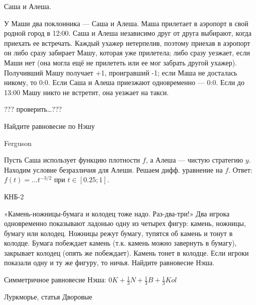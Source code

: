 \begin{problem}
Саша и Алеша.

У Маши два поклонника — Саша и Алеша. Маша прилетает в аэропорт в свой родной город в 12:00. Саша и Алеша независимо друг от друга выбирают, когда приехать ее встречать. Каждый ухажер нетерпелив, поэтому приехав в аэропорт он либо сразу забирает Машу, которая уже прилетела; либо сразу уезжает, если Маши нет (она могла ещё не прилететь или ее мог забрать другой ухажер). Получивший Машу получает +1, проигравший -1; если Маша не досталась никому, то 0:0. Если Саша и Алеша приезжают одновременно — 0:0. Если до 13:00 Машу никто не встретит, она уезжает на такси.

??? проверить\ldots ???


Найдите равновесие по Нэшу



\begin{source}
Ferguson
\end{source}


\begin{sol}
Пусть Саша использует функцию плотности $f$, а Алеша — чистую стратегию $y$. Находим условие безразличия для Алеши. Решаем дифф. уравнение на $f$. Ответ: $f(t)=\ldots t^{-3/2}$ при $t\in[0.25;1]$.
\end{sol}
\end{problem}



\begin{problem}
КНБ-2

«Камень-ножницы-бумага и колодец тоже надо. Раз-два-три!»
Два игрока одновременно показывают ладонью одну из четырех фигур: камень, ножницы, бумагу или колодец. Ножницы режут бумагу, тупятся об камень и тонут в колодце. Бумага побеждает камень (т.к. камень можно завернуть в бумагу), закрывает колодец (опять же побеждает). Камень тонет в колодце. Если игроки показали одну и ту же фигуру, то ничья. Найдите равновесие Нэша.



\begin{sol}
Симметричное равновесие Нэша: $0K+\frac{1}{3}N+\frac{1}{3}B+\frac{1}{3}Kol$
\end{sol}
\end{problem}


\begin{source}
Луркморье, статья Дворовые
\end{source}




